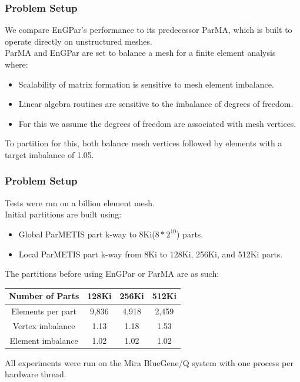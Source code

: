 \documentclass{beamer}
\begin{document}
\begin{frame}
  \frametitle{Problem Setup}
  We compare EnGPar's performance to its predecessor ParMA, which is built to operate directly on unstructured meshes.\\
  \medskip
  ParMA and EnGPar are set to balance a mesh for a finite element analysis where:
  \begin{itemize}
  \item Scalability of matrix formation is sensitive to mesh element imbalance.
  \item Linear algebra routines are sensitive to the imbalance of degrees of freedom.
  \item For this we assume the degrees of freedom are associated with mesh vertices.
  \end{itemize}
  \bigskip
  To partition for this, both balance mesh vertices followed by elements with a target imbalance of 1.05. \\
  
\end{frame}

\begin{frame}
  \frametitle{Problem Setup}
  \medskip
  Tests were run on a billion element mesh. \\
  \medskip
  Initial partitions are built using:
  \begin{itemize}
  \item Global ParMETIS part k-way to 8Ki($8*2^{10}$) parts.
  \item Local ParMETIS part k-way from 8Ki to 128Ki, 256Ki, and 512Ki parts.
  \end{itemize}
  The partitions before using EnGPar or ParMA are as such:\\
  \begin{table}[!h]
    \centering
    \begin{tabular}{||c|c|c|c||}
      \hline
      Number of Parts &128Ki&256Ki&512Ki \\
      \hline
      Elements per part & 9,836 & 4,918&2,459  \\
      \hline
      Vertex imbalance & 1.13 & 1.18 & 1.53 \\
      \hline
      Element imbalance & 1.02& 1.02& 1.02\\
      \hline
    \end{tabular}
  \end{table}
  All experiments were run on the Mira BlueGene/Q system with one process per hardware thread.
\end{frame}
\end{document}
